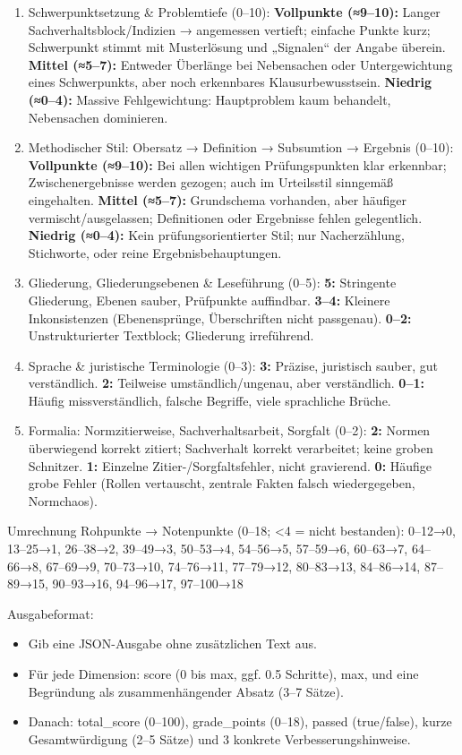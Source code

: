 \documentclass[11pt]{article}
\providecommand{\tightlist}{%
  \setlength{\itemsep}{0pt}\setlength{\parskip}{0pt}}
\begin{document}
\begin{enumerate}
\item
  Schwerpunktsetzung \& Problemtiefe (0--10): \textbf{Vollpunkte
  (≈9--10):} Langer Sachverhaltsblock/Indizien → angemessen vertieft;
  einfache Punkte kurz; Schwerpunkt stimmt mit Musterlösung und
  „Signalen`` der Angabe überein. \textbf{Mittel (≈5--7):} Entweder
  Überlänge bei Nebensachen oder Untergewichtung eines Schwerpunkts,
  aber noch erkennbares Klausurbewusstsein. \textbf{Niedrig (≈0--4):}
  Massive Fehlgewichtung: Hauptproblem kaum behandelt, Nebensachen
  dominieren.
\item
  Methodischer Stil: Obersatz → Definition → Subsumtion → Ergebnis
  (0--10): \textbf{Vollpunkte (≈9--10):} Bei allen wichtigen
  Prüfungspunkten klar erkennbar; Zwischenergebnisse werden gezogen;
  auch im Urteilsstil sinngemäß eingehalten. \textbf{Mittel (≈5--7):}
  Grundschema vorhanden, aber häufiger vermischt/ausgelassen;
  Definitionen oder Ergebnisse fehlen gelegentlich. \textbf{Niedrig
  (≈0--4):} Kein prüfungsorientierter Stil; nur Nacherzählung,
  Stichworte, oder reine Ergebnisbehauptungen.
\item
  Gliederung, Gliederungsebenen \& Leseführung (0--5): \textbf{5:}
  Stringente Gliederung, Ebenen sauber, Prüfpunkte auffindbar.
  \textbf{3--4:} Kleinere Inkonsistenzen (Ebenensprünge, Überschriften
  nicht passgenau). \textbf{0--2:} Unstrukturierter Textblock;
  Gliederung irreführend.
\item
  Sprache \& juristische Terminologie (0--3): \textbf{3:} Präzise,
  juristisch sauber, gut verständlich. \textbf{2:} Teilweise
  umständlich/ungenau, aber verständlich. \textbf{0--1:} Häufig
  missverständlich, falsche Begriffe, viele sprachliche Brüche.
\item
  Formalia: Normzitierweise, Sachverhaltsarbeit, Sorgfalt (0--2):
  \textbf{2:} Normen überwiegend korrekt zitiert; Sachverhalt korrekt
  verarbeitet; keine groben Schnitzer. \textbf{1:} Einzelne
  Zitier-/Sorgfaltsfehler, nicht gravierend. \textbf{0:} Häufige grobe
  Fehler (Rollen vertauscht, zentrale Fakten falsch wiedergegeben,
  Normchaos).
\end{enumerate}

Umrechnung Rohpunkte → Notenpunkte (0--18; \textless4 = nicht
bestanden): 0--12→0, 13--25→1, 26--38→2, 39--49→3, 50--53→4, 54--56→5,
57--59→6, 60--63→7, 64--66→8, 67--69→9, 70--73→10, 74--76→11, 77--79→12,
80--83→13, 84--86→14, 87--89→15, 90--93→16, 94--96→17, 97--100→18

Ausgabeformat:

\begin{itemize}
\tightlist
\item
  Gib eine JSON-Ausgabe ohne zusätzlichen Text aus.
\item
  Für jede Dimension: score (0 bis max, ggf. 0.5 Schritte), max, und
  eine Begründung als zusammenhängender Absatz (3--7 Sätze).
\item
  Danach: total\_score (0--100), grade\_points (0--18), passed
  (true/false), kurze Gesamtwürdigung (2--5 Sätze) und 3 konkrete
  Verbesserungshinweise.
\end{itemize}
\end{document}
